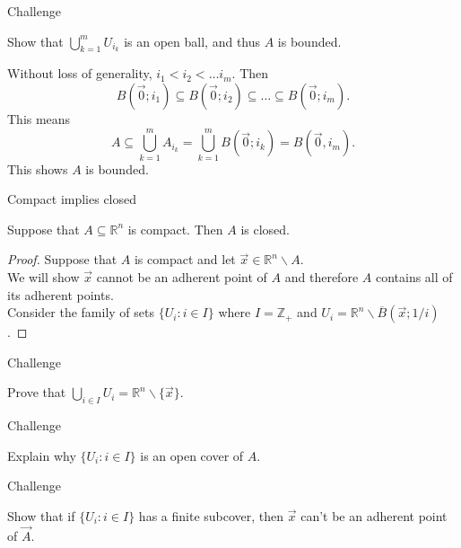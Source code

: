 \documentclass{beamer}
\begin{document}
\begin{frame}{Challenge}
\begin{prob}
Show that $\bigcup_{k=1}^m U_{i_k}$ is an open ball, and thus $A$ is bounded.
\end{prob}
\pause
\begin{soln}
Without loss of generality, $i_1 < i_2 < \dots i_m$.
\pause
Then
$$B(\vec 0; i_1) \subseteq B(\vec 0; i_2)\subseteq\dots\subseteq B(\vec 0; i_m).$$
\pause
This means 
$$A\subseteq \bigcup_{k=1}^m A_{i_k} = \bigcup_{k=1}^m B(\vec 0; i_k) = B(\vec 0,i_m).$$
\pause
This shows $A$ is bounded.
\end{soln}
\end{frame}

\begin{frame}{Compact implies closed}
\begin{thm}
Suppose that $A\subseteq\mathbb{R}^n$ is compact.
Then $A$ is closed.
\end{thm}
\pause
\begin{proof}
\pause
Suppose that $A$ is compact and let $\vec x\in \mathbb{R}^n\backslash A$.\\
\pause
We will show $\vec x$ cannot be an adherent point of $A$ and therefore $A$ contains all of its adherent points.\\
\pause
Consider the family of sets $\{U_i: i\in I\}$ where $I=\mathbb{Z}_+$ and $U_i = \mathbb{R}^n\backslash \overline B(\vec x; 1/i)$.
\end{proof}
\end{frame}

\begin{frame}{Challenge}
\begin{prob}
Prove that $\bigcup_{i\in I} U_i = \mathbb{R}^n\backslash \{\vec x\}$.
\end{prob}
\end{frame}

\begin{frame}{Challenge}
\begin{prob}
Explain why $\{U_i: i\in I\}$ is an open cover of $A$.
\end{prob}
\end{frame}

\begin{frame}{Challenge}
\begin{prob}
Show that if $\{U_i: i\in I\}$ has a finite subcover, then $\vec x$ can't be an adherent point of $\vec A$.
\end{prob}
\end{frame}
\end{document}
